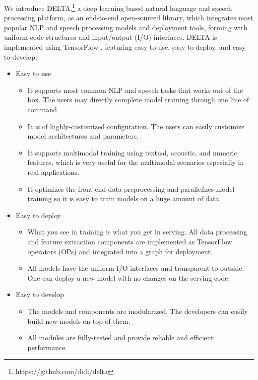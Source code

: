 \documentclass{article}
\begin{document}
We introduce DELTA,\footnote{https://github.com/didi/delta} a deep learning based natural language and speech processing platform, as an end-to-end open-sourced library, which integrates most popular NLP and speech processing models and deployment tools, forming with uniform code structures and input/output (I/O) interfaces. DELTA is implemented using TensorFlow \citep{tensorflow2015-whitepaper}, featuring easy-to-use, easy-to-deploy, and easy-to-develop:
\begin{itemize}
    \item Easy to use
    \begin{itemize}
        \item It supports most common NLP and speech tasks that works out of the box. The users may directly complete model training through one line of command.
        \item It is of highly-customized configuration. The users can easily customize model architectures and parameters.
        \item It supports multimodal training using textual, acoustic, and numeric features, which is very useful for the multimodal scenarios especially in real applications.
        \item It optimizes the front-end data preprocessing and parallelizes model training so it is easy to train models on a huge amount of data.
    \end{itemize}

    \item Easy to deploy
    \begin{itemize}
        \item What you see in training is what you get in serving. All data processing and feature extraction components are implemented as TensorFlow operators (OPs) and integrated into a graph for deployment.
        \item All models have the uniform I/O interfaces and transparent to outside. One can deploy a new model with no changes on the serving code.
    \end{itemize}

    \item Easy to develop
    \begin{itemize}
        \item The models and components are modularized. The developers can easily build new models on top of them.
        \item All modules are fully-tested and provide reliable and efficient performance.
    \end{itemize}
\end{itemize}
\end{document}

